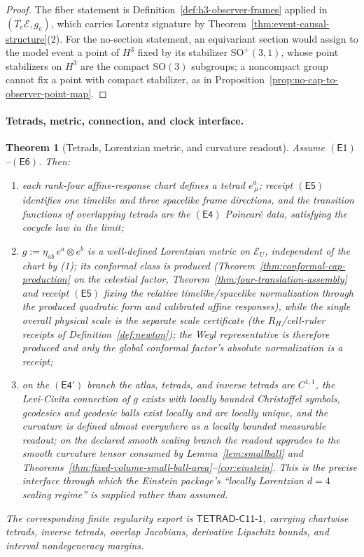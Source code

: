 \documentclass[11pt]{article}
\newtheorem{theorem}{Theorem}[section]
\begin{document}
\begin{proof}
The fiber statement is Definition~\ref{def:h3-observer-frames} applied in
\((T_e\mathcal E,g_e)\), which carries Lorentz signature by
Theorem~\ref{thm:event-causal-structure}(2). For the no-section statement,
an equivariant section would assign to the model event a point of \(H^3\)
fixed by its stabilizer \(\mathrm{SO}^{+}(3,1)\), whose point stabilizers on
\(H^3\) are the compact \(\mathrm{SO}(3)\) subgroups; a noncompact group
cannot fix a point with compact stabilizer, as in
Proposition~\ref{prop:no-cap-to-observer-point-map}.
\end{proof}

\paragraph{Tetrads, metric, connection, and clock interface.}

\begin{theorem}[Tetrads, Lorentzian metric, and curvature readout]
\label{thm:event-tetrad-metric}
Assume \(\mathsf{(E1)}\)--\(\mathsf{(E6)}\). Then:
\begin{enumerate}[leftmargin=2em]
\item each rank-four affine-response chart defines a tetrad
\(e_{\,\mu}^{a}\); receipt \(\mathsf{(E5)}\) identifies one timelike and three
spacelike frame directions, and the transition functions of overlapping
tetrads are the \(\mathsf{(E4)}\) Poincar\'e data, satisfying the cocycle law
in the limit;
\item \(g:=\eta_{ab}\,e^{a}\otimes e^{b}\) is a well-defined Lorentzian metric
on \(\mathcal E_U\), independent of the chart by (1); its conformal class is
produced (Theorem~\ref{thm:conformal-cap-production} on the celestial factor,
Theorem~\ref{thm:four-translation-assembly} and receipt \(\mathsf{(E5)}\) fixing
the relative timelike/spacelike normalization through the produced quadratic
form and calibrated affine responses), while the single overall
physical scale is the separate scale certificate
(the \(R_H\)/cell-ruler receipts of Definition~\ref{def:newton}); the Weyl
representative is therefore produced and only the global conformal factor's
absolute normalization is a receipt;
\item on the \(\mathsf{(E4')}\) branch the atlas, tetrads, and inverse tetrads are \(C^{1,1}\), the
Levi-Civita connection of \(g\) exists with locally bounded Christoffel
symbols, geodesics and geodesic balls exist locally and are locally unique,
and the curvature is defined almost everywhere as a locally bounded measurable readout; on the
declared smooth scaling branch the readout upgrades to the smooth curvature
tensor consumed by Lemma~\ref{lem:smallball} and
Theorems~\ref{thm:fixed-volume-small-ball-area}--\ref{cor:einstein}. This is
the precise interface through which the Einstein package's ``locally
Lorentzian \(d=4\) scaling regime'' is supplied rather than assumed.
\end{enumerate}
The corresponding finite regularity export is
\(\mathsf{TETRAD\text{-}C11\text{-}1}\), carrying chartwise tetrads, inverse tetrads, overlap
Jacobians, derivative Lipschitz bounds, and interval nondegeneracy margins.
\end{theorem}
\end{document}
